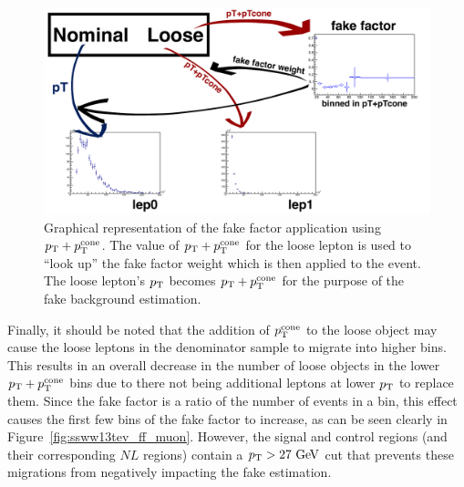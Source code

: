 \begin{figure}[htbp]
  \centering
  \includegraphics[width=.95\textwidth]{figs/ssww_13tev/backgrounds/ff/apply_ff}
  \caption{Graphical representation of the fake factor application using $p_{\mathrm{T}}+p_{\mathrm{T}}^{\textrm{cone}}$.  The value of $p_{\mathrm{T}}+p_{\mathrm{T}}^{\textrm{cone}}$ for the loose lepton is used to ``look up'' the fake factor weight which is then applied to the event.  The loose lepton's $p_{\mathrm{T}}$ becomes $p_{\mathrm{T}}+p_{\mathrm{T}}^{\textrm{cone}}$ for the purpose of the fake background estimation.}
  \label{fig:ssww13tev_ff_application}
\end{figure}

Finally, it should be noted that the addition of $p_{\mathrm{T}}^{\textrm{cone}}$ to the loose object may cause the loose leptons in the denominator sample to migrate into higher bins.
This results in an overall decrease in the number of loose objects in the lower $p_{\mathrm{T}}+p_{\mathrm{T}}^{\textrm{cone}}$ bins due to there not being additional leptons at lower $p_{\mathrm{T}}$ to replace them.
Since the fake factor is a ratio of the number of events in a bin, this effect causes the first few bins of the fake factor to increase, as can be seen clearly in Figure~\ref{fig:ssww13tev_ff_muon}.
However, the signal and control regions (and their corresponding $NL$ regions) contain a $\pt > 27\gev$ cut that prevents these migrations from negatively impacting the fake estimation.

%
